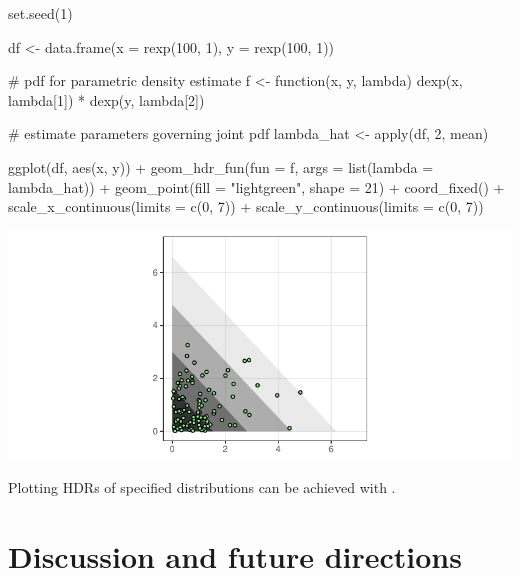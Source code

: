 \begin{knitrout}
\color{fgcolor}\begin{kframe}
\begin{example}
set.seed(1)

df <- data.frame(x = rexp(100, 1), y = rexp(100, 1))

# pdf for parametric density estimate
f <- function(x, y, lambda) dexp(x, lambda[1]) * dexp(y, lambda[2])

# estimate parameters governing joint pdf
lambda_hat <- apply(df, 2, mean)

ggplot(df, aes(x, y)) +
  geom_hdr_fun(fun = f, args = list(lambda = lambda_hat)) +
  geom_point(fill = "lightgreen", shape = 21) +
  coord_fixed() +
  scale_x_continuous(limits = c(0, 7)) +
  scale_y_continuous(limits = c(0, 7))
\end{example}
\end{kframe}
\end{knitrout}
\begin{knitrout}
\color{fgcolor}\begin{widefigure}[h!]

{\centering \includegraphics[width=\maxwidth]{figures/exp_example-1}

}

\caption{Plotting HDRs of specified distributions can be achieved with .}\label{fig:exp_example}
\end{widefigure}

\end{knitrout}


\section{Discussion and future directions}\label{sec:discussion}

